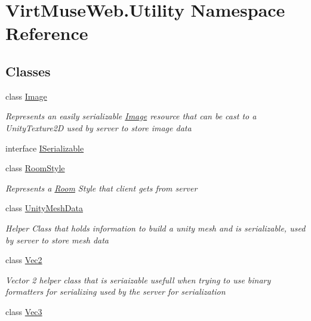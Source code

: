 \hypertarget{namespace_virt_muse_web_1_1_utility}{}\section{Virt\+Muse\+Web.\+Utility Namespace Reference}
\label{namespace_virt_muse_web_1_1_utility}
\subsection*{Classes}
\begin{DoxyCompactItemize}
\item 
class \mbox{\hyperlink{class_virt_muse_web_1_1_utility_1_1_image}{Image}}
\begin{DoxyCompactList}\small\item\em Represents an easily serializable \mbox{\hyperlink{class_virt_muse_web_1_1_utility_1_1_image}{Image}} resource that can be cast to a Unity\+Texture2D used by server to store image data \end{DoxyCompactList}\item 
interface \mbox{\hyperlink{interface_virt_muse_web_1_1_utility_1_1_i_serializable}{I\+Serializable}}
\item 
class \mbox{\hyperlink{class_virt_muse_web_1_1_utility_1_1_room_style}{Room\+Style}}
\begin{DoxyCompactList}\small\item\em Represents a \mbox{\hyperlink{class_room}{Room}} Style that client gets from server \end{DoxyCompactList}\item 
class \mbox{\hyperlink{class_virt_muse_web_1_1_utility_1_1_unity_mesh_data}{Unity\+Mesh\+Data}}
\begin{DoxyCompactList}\small\item\em Helper Class that holds information to build a unity mesh and is serializable, used by server to store mesh data \end{DoxyCompactList}\item 
class \mbox{\hyperlink{class_virt_muse_web_1_1_utility_1_1_vec2}{Vec2}}
\begin{DoxyCompactList}\small\item\em Vector 2 helper class that is seriaizable usefull when trying to use binary formatters for serializing used by the server for serialization \end{DoxyCompactList}\item 
class \mbox{\hyperlink{class_virt_muse_web_1_1_utility_1_1_vec3}{Vec3}}

\end{DoxyCompactItemize}
